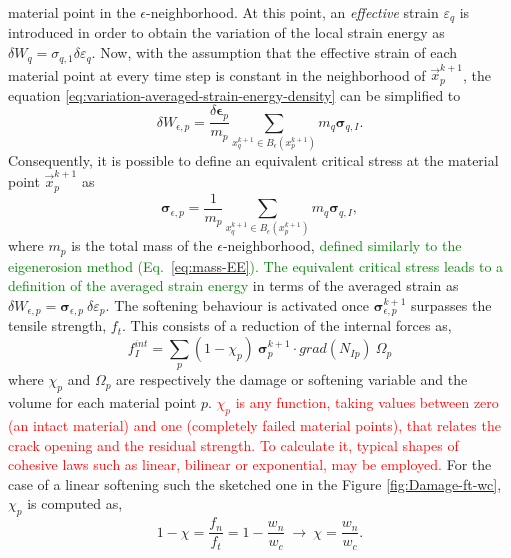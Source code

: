 \documentclass[preprint,12pt,a4paper]{elsarticle}
\newcommand{\tens}[1]{
  \ensuremath{\mathbf{{#1}}}
}
\newcommand\Grad[1]{grad({#1})}
\newcommand{\PNA}[1]{
  \textcolor{red}{{#1}}
}
\newcommand{\DM}[1]{
  \textcolor{green}{{#1}}
}
\begin{document}
material point in the $\epsilon$-neighborhood. At this point, an \textit{effective} strain $\varepsilon_q$ is introduced in order to obtain the variation of
the local strain energy as $\delta W_q = \sigma_{q,1}
\delta\varepsilon_q$. Now, with the assumption that the effective
strain of each material point at every time step is constant in the
neighborhood of $\vec{x}_p^{k+1}$, the equation 
\eqref{eq:variation-averaged-strain-energy-density} can be simplified
 to
\begin{equation}
  \label{eq:variation-averaged-strain-energy-density-simpli}
  \delta W_{\epsilon,p} =
  \frac{\delta \tens{\epsilon}_p}{m_p} \sum_{x_q^{k+1} \in
  B_{\epsilon}(x_p^{k+1})} m_q \tens{\sigma}_{q,I}. 
\end{equation}
Consequently, it is possible to define an equivalent critical stress at the
material point $\vec{x}_p^{k+1}$ as
\begin{equation}
  \label{eq:equivalent-critical-stress}
  \tens{\sigma}_{\epsilon,p} =
  \frac{1}{m_p} \sum_{x_q^{k+1} \in
  B_{\epsilon}(x_p^{k+1})} m_q \tens{\sigma}_{q,I}, 
\end{equation}
where $m_p$ is the total mass of the
$\epsilon$-neighborhood,\DM{defined similarly to the eigenerosion
  method (Eq.~\eqref{eq:mass-EE}). The equivalent critical stress
  leads to a definition of the   averaged strain energy} in terms of the averaged
strain as $\delta W_{\epsilon,p} =
 \tens{\sigma}_{\epsilon,p}\ \delta\varepsilon_p$. The softening behaviour is
activated once $\tens{\sigma}_{\epsilon,p}^{k+1}$ surpasses the
tensile strength, $f_t$. This consists of a reduction of the internal
forces as, 
 \begin{equation}
   \label{eq:f-int-damaged}
   f^{int}_I = \sum_p (1 - \chi_p)\ \tens{\sigma}_{p}^{k+1} \cdot
   \Grad{N_{Ip}}\ \Omega_p
 \end{equation}
where $\chi_p$ and $\Omega_p$ are respectively the damage or softening
variable and the volume for each material point $p$. \PNA{$\chi_p$ is any function, taking
values between zero (an intact material) and one (completely failed
material points), that relates the crack opening and the residual strength. To calculate it, typical shapes of cohesive laws such as linear, bilinear or exponential, may be employed.} For the case of a linear softening such the sketched one in the Figure \ref{fig:Damage-ft-wc}, $\chi_p$ is computed as,
 \begin{equation}
   \label{eq:damaged-variable-chi}
   1 - \chi = \frac{f_n}{f_t} = 1 - \frac{w_n}{w_c}\ \rightarrow\ \chi
   = \frac{w_n}{w_c}.
 \end{equation}
\end{document}
